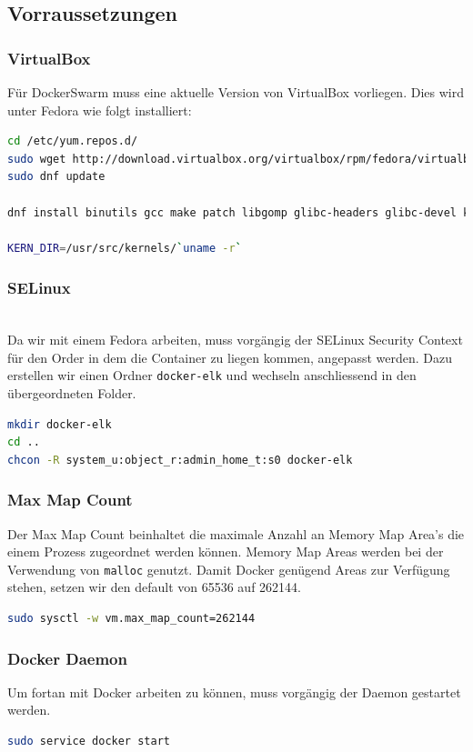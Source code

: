 \subsection{Vorraussetzungen}
\subsubsection{VirtualBox}
Für DockerSwarm muss eine aktuelle Version von VirtualBox vorliegen. Dies wird unter Fedora wie folgt installiert:
\begin{lstlisting}[language=bash]
cd /etc/yum.repos.d/ 
sudo wget http://download.virtualbox.org/virtualbox/rpm/fedora/virtualbox.repo
sudo dnf update

dnf install binutils gcc make patch libgomp glibc-headers glibc-devel kernel-headers kernel-devel dkms

KERN_DIR=/usr/src/kernels/`uname -r`
\end{lstlisting}


\subsubsection{SELinux} \hfill \\
Da wir mit einem Fedora arbeiten, muss vorgängig der SELinux Security Context für den Order in dem die Container zu liegen kommen, angepasst werden. Dazu erstellen wir einen Ordner \lstinline[]|docker-elk| und wechseln anschliessend in den übergeordneten Folder.
\begin{lstlisting}[language=bash]
mkdir docker-elk
cd ..
chcon -R system_u:object_r:admin_home_t:s0 docker-elk
\end{lstlisting}

\subsubsection{Max Map Count}
Der Max Map Count beinhaltet die maximale Anzahl an Memory Map Area's die einem Prozess zugeordnet werden können. Memory Map Areas werden bei der Verwendung von \lstinline[]|malloc| genutzt. Damit Docker genügend Areas zur Verfügung stehen, setzen wir den default von 65536 auf 262144.
\begin{lstlisting}[language=bash]
sudo sysctl -w vm.max_map_count=262144
\end{lstlisting}

\subsubsection{Docker Daemon}
Um fortan mit Docker arbeiten zu können, muss vorgängig der Daemon gestartet werden.
\begin{lstlisting}[language=bash]
sudo service docker start
\end{lstlisting}

